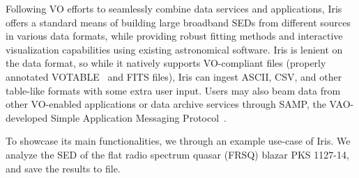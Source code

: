 \documentclass[5p]{elsarticle}
\begin{document}
Following VO efforts to seamlessly combine data services and applications, Iris offers a standard means of building large broadband SEDs from different sources in various data formats, while providing robust fitting methods and interactive visualization capabilities using existing astronomical software. Iris is lenient on the data format, so while it natively supports VO-compliant files (properly annotated VOTABLE~\citep{2011arXiv1110.0524O} and FITS files), Iris can ingest ASCII, CSV, and other table-like formats with some extra user input. Users may also beam data from other VO-enabled applications or data archive services through SAMP, the VAO-developed Simple Application Messaging Protocol~\citep{2011arXiv1110.0528T}. 


To showcase its main functionalities, we through an example use-case of Iris. We analyze the SED of the flat radio spectrum quasar (FRSQ) blazar PKS 1127-14, and save the results to file.



\end{document}
